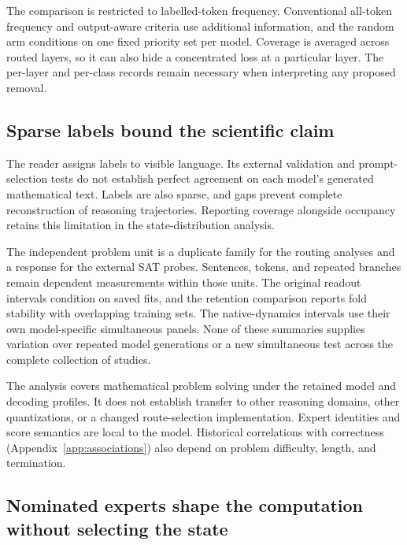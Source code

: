 The comparison is restricted to labelled-token frequency.
%
Conventional all-token frequency and output-aware criteria use additional information, and the random arm conditions on one fixed priority set per model.
%
Coverage is averaged across routed layers, so it can also hide a concentrated loss at a particular layer.
%
The per-layer and per-class records remain necessary when interpreting any proposed removal.
%

\subsection{Sparse labels bound the scientific claim}

The reader assigns labels to visible language.
%
Its external validation and prompt-selection tests do not establish perfect agreement on each model's generated mathematical text.
%
Labels are also sparse, and gaps prevent complete reconstruction of reasoning trajectories.
%
Reporting coverage alongside occupancy retains this limitation in the state-distribution analysis.
%

The independent problem unit is a duplicate family for the routing analyses and a response for the external SAT probes.
%
Sentences, tokens, and repeated branches remain dependent measurements within those units.
%
The original readout intervals condition on saved fits, and the retention comparison reports fold stability with overlapping training sets.
%
The native-dynamics intervals use their own model-specific simultaneous panels.
%
None of these summaries supplies variation over repeated model generations or a new simultaneous test across the complete collection of studies.
%

The analysis covers mathematical problem solving under the retained model and decoding profiles.
%
It does not establish transfer to other reasoning domains, other quantizations, or a changed route-selection implementation.
%
Expert identities and score semantics are local to the model.
%
Historical correlations with correctness (\mbox{Appendix~\ref{app:associations}}) also depend on problem difficulty, length, and termination.
%

\subsection{Nominated experts shape the computation without selecting the state}

